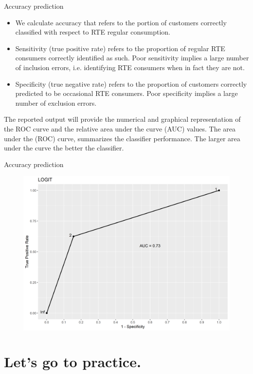 \documentclass[12pt]{beamer}
\begin{document}
\begin{frame}{Accuracy prediction}
	\scriptsize
\begin{itemize}
	\item We calculate accuracy that refers to the portion of customers correctly classified with respect to RTE regular consumption.
	
	\item Sensitivity (true positive rate) refers to the proportion of regular RTE consumers correctly identified as such. Poor sensitivity implies a large number of inclusion errors, i.e. identifying RTE consumers when in fact they are not.
	\item   Specificity (true negative rate) refers to the proportion of customers correctly predicted to be occasional RTE consumers. Poor specificity implies a large number of exclusion errors. 
\end{itemize}


The reported output will provide the numerical and graphical representation of the ROC curve and the relative area under the curve (AUC) values. The area under the (ROC) curve, summarizes the classifier performance. The larger area under the curve the better the classifier.
\end{frame}

\begin{frame}{Accuracy prediction}
		\small
	\begin{figure}
		\centering
		\includegraphics[width=.8\linewidth]{logit}
	\end{figure}
\end{frame}

\section{Let's go to practice.}



\end{document}
